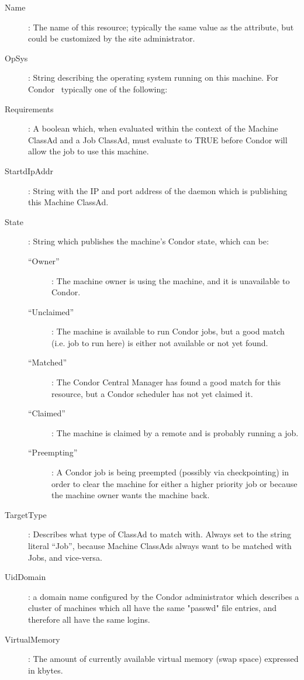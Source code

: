 \begin{description}
%
\item[Name] : The name of this resource; typically the same value as
the  attribute, but could be customized by the site administrator.
%
\item[OpSys] : String describing the operating system running on this
machine.  For Condor \VersionNotice\ typically one of the following:
%
\item[Requirements] : A boolean which, when evaluated within the context
of the Machine ClassAd and a Job ClassAd, must evaluate to
TRUE before Condor will allow the job to use this machine.
%
\item[StartdIpAddr] : String with the IP and port address of the
 daemon which is publishing this Machine ClassAd.
%
\item[State] : String which publishes the machine's Condor state, which
can be:
	\begin{description}
	\item[``Owner''] : The machine owner is using the machine, and
it is unavailable to Condor.
	\item[``Unclaimed''] : The machine is available to run Condor jobs,
but a good match (i.e. job to run here) is either not available or not 
yet found.
	\item[``Matched''] : The Condor Central Manager has found a good
match for this resource, but a Condor scheduler has not yet claimed it.
	\item[``Claimed''] : The machine is claimed by a remote
 and is probably running a job.
	\item[``Preempting''] : A Condor job is being preempted (possibly
via checkpointing) in order to clear the machine for either a higher
priority job or because the machine owner wants the machine back.
	\end{description}   %
%
\item[TargetType] : Describes what type of ClassAd to match with.
Always set to the string literal ``Job'', because Machine ClassAds
always want to be matched with Jobs, and vice-versa.
%
\item[UidDomain] : a domain name configured by the Condor 
administrator which describes a cluster of machines which all have 
the same "passwd" file entries, and therefore all have the same logins.
%
\item[VirtualMemory] : The amount of currently available virtual memory 
(swap space) expressed in kbytes.

\end{description}
